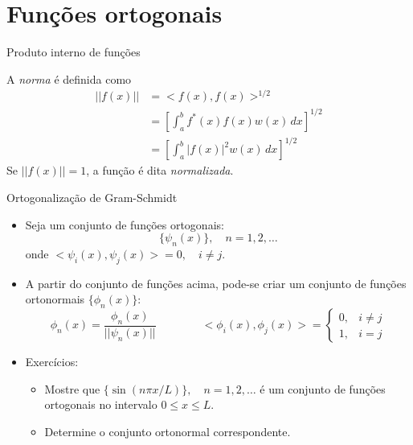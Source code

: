      \section[slide=True]{Funções ortogonais}

     \begin{slide}[toc=]{Produto interno de funções}
	     \begin{itemize}
			     {
		     \item A \emph{norma} é definida como 
			     \begin{align*}
				     ||f(x)|| &= <f(x),f(x)>^{1/2}\\
					      &= \left [\int_a^bf^\ast(x)f(x)w(x)\,dx \right ]^{1/2}\\
					      &= \left [\int_a^b|f(x)|^2w(x)\,dx \right ]^{1/2}
			     \end{align*}
			     Se $||f(x)||=1$, a função é dita \emph{normalizada}.}
	     \end{itemize}
     \end{slide}

     \begin{slide}[toc=]{Ortogonalização de Gram-Schmidt}
	     \begin{itemize}
		     \item Seja um conjunto de funções ortogonais:
			     \begin{equation*}
				     \{ \psi_n(x) \},\quad n=1,2, \dots
			     \end{equation*}
			     onde $<\psi_i(x), \psi_j(x)> = 0,\quad i\neq j$.
		     \item A partir do conjunto de funções acima, pode-se criar um conjunto de funções ortonormais $\{\phi_n(x)\}$:
			     \begin{equation*}
				     \phi_n(x)=\frac{\phi_n(x)}{||\psi_n(x)||}\qquad\qquad 
				     <\phi_i(x),\phi_j(x)>=\begin{cases} 0, & i\neq j\\1, & i=j\end{cases}
			     \end{equation*}
		     \item Exercícios:
			     \begin{itemize}
				     \item Mostre que $\{ \sin (n\pi x/L)\}, \quad n = 1, 2, \dots$ é um conjunto de funções  ortogonais no intervalo $0\leq x \leq L$.
				     \item Determine o conjunto ortonormal correspondente.
			     \end{itemize}
	     \end{itemize}
     \end{slide}


